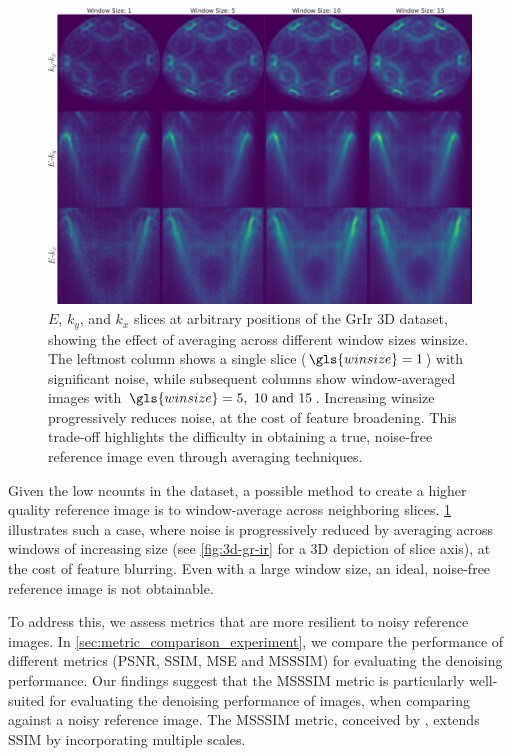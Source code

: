 \begin{figure}
    \centering
    \includegraphics[width=1\linewidth]{images/slices.pdf}
    \caption{$E$, $k_y$, and $k_x$ slices at arbitrary positions of the \gls{GrIr} 3D dataset, showing the effect of averaging across different window sizes \gls{winsize}. The leftmost column shows a single slice ($\gls{winsize}=1$) with significant noise, while subsequent columns show window-averaged images with $\gls{winsize}=\numlist{5;10;15}$. Increasing \gls{winsize} progressively reduces noise, at the cost of feature broadening. This trade-off highlights the difficulty in obtaining a true, noise-free reference image even through averaging techniques.}
    \label{fig:slices}
\end{figure}

Given the low \gls{ncounts} in the dataset, a possible method to create a higher quality reference image is to window-average across neighboring slices. \cref{fig:slices} illustrates such a case, where noise is progressively reduced by averaging across windows of increasing size (see \cref{fig:3d-gr-ir} for a 3D depiction of slice axis), at the cost of feature blurring. Even with a large window size, an ideal, noise-free reference image is not obtainable.

To address this, we assess metrics that are more resilient to noisy reference images. In \cref{sec:metric_comparison_experiment}, we compare the performance of different metrics (\gls{PSNR}, \gls{SSIM}, \gls{MSE} and \gls{MSSSIM}) for evaluating the denoising performance. Our findings suggest that the \gls{MSSSIM} metric is particularly well-suited for evaluating the denoising performance of images, when comparing against a noisy reference image. The \gls{MSSSIM} metric, conceived by \citeauthor{wangMultiscaleStructuralSimilarity2003} \cite{wangMultiscaleStructuralSimilarity2003}, extends SSIM by incorporating multiple scales. 

